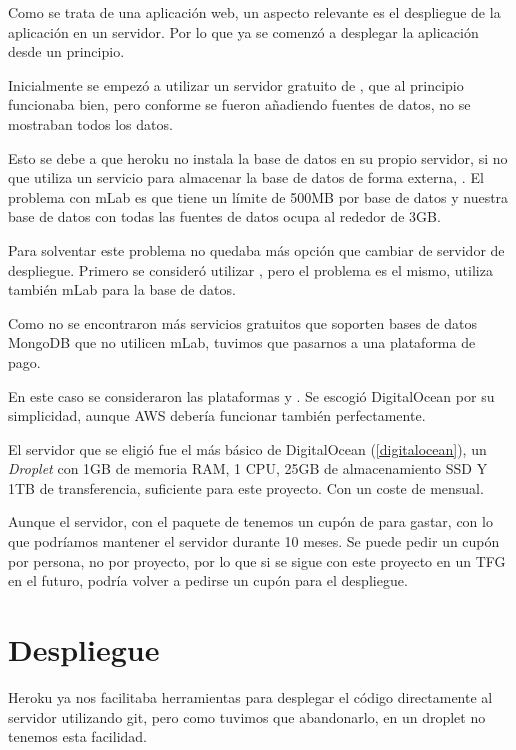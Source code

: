 Como se trata de una aplicación web, un aspecto relevante es el despliegue de la aplicación en un servidor. Por lo que ya se comenzó a desplegar la aplicación desde un principio.

Inicialmente se empezó a utilizar un servidor gratuito de , que al principio funcionaba bien, pero conforme se fueron añadiendo fuentes de datos, no se mostraban todos los datos.

Esto se debe a que heroku no instala la base de datos en su propio servidor, si no que utiliza un servicio para almacenar la base de datos de forma externa, . El problema con mLab es que tiene un límite de 500MB por base de datos y nuestra base de datos con todas las fuentes de datos ocupa al rededor de 3GB.

Para solventar este problema no quedaba más opción que cambiar de servidor de despliegue. Primero se consideró utilizar , pero el problema es el mismo, utiliza también mLab para la base de datos.

Como no se encontraron más servicios gratuitos que soporten bases de datos MongoDB que no utilicen mLab, tuvimos que pasarnos a una plataforma de pago.

En este caso se consideraron las plataformas  y . Se escogió DigitalOcean por su simplicidad, aunque AWS debería funcionar también perfectamente.

El servidor que se eligió fue el más básico de DigitalOcean (\ref{digitalocean}), un \textit{Droplet} con 1GB de memoria RAM, 1 CPU, 25GB de almacenamiento SSD Y 1TB de transferencia, suficiente para este proyecto. Con un coste de  mensual.

Aunque el servidor, con el paquete de  tenemos un cupón de  para gastar, con lo que podríamos mantener el servidor durante 10 meses. Se puede pedir un cupón por persona, no por proyecto, por lo que si se sigue con este proyecto en un TFG en el futuro, podría volver a pedirse un cupón para el despliegue.

\section{Despliegue}

Heroku ya nos facilitaba herramientas para desplegar el código directamente al servidor utilizando git, pero como tuvimos que abandonarlo, en un droplet no tenemos esta facilidad.

